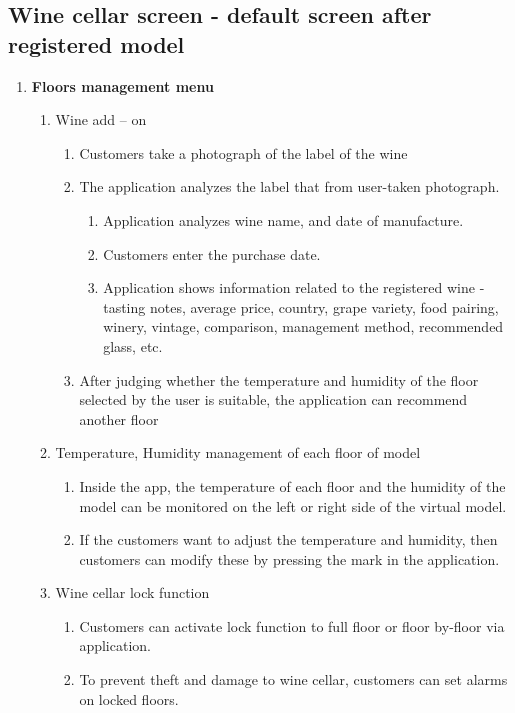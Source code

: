 \documentclass[sigconf, nonacm]{acmart}
\begin{document}
\subsection{Wine cellar screen - default screen after registered model}
\begin{enumerate}
\item \textbf{Floors management menu}

\begin{enumerate}
\item Wine add – on
 \begin{enumerate}
    \item Customers take a photograph of the label of the wine
    \item The application analyzes the label that from user-taken
	photograph.
	\begin{enumerate}
	\item Application analyzes wine name, and date of 
    manufacture.
    \item Customers enter the purchase date.
    \item Application shows information related to the 
    registered wine - tasting notes, average price, country,
    grape variety, food pairing, winery, vintage,
    comparison, management method, recommended
    glass, etc.
	\end{enumerate}
	\item After judging whether the temperature and humidity of the floor selected by the user is suitable, the application
can recommend another floor
\end{enumerate}

\item Temperature, Humidity management of each floor of model
\begin{enumerate}
    \item Inside the app, the temperature of each floor and the humidity of the model can be monitored on the left or right side of the virtual model.
    \item If the customers want to adjust the temperature and 	humidity, then customers can modify these by pressing 	the mark in the application.
\end{enumerate}

\item  Wine cellar lock function
\begin{enumerate}
    \item Customers can activate lock function to full floor or 	floor by-floor via application.
    \item To prevent theft and damage to wine cellar, customers 	can set alarms on locked floors.
\end{enumerate}


\end{enumerate}
\end{enumerate}
\end{document}
